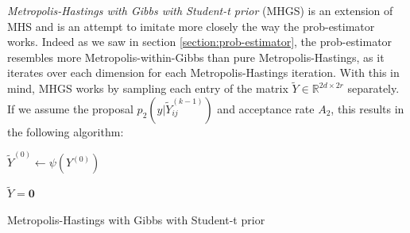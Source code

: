 \documentclass[12pt]{memoir}
\newcommand{\mb}{\mathbf}
\begin{document}
\textit{Metropolis-Hastings with Gibbs with Student-t prior} (MHGS) is an extension of MHS and is an attempt to imitate more closely the way the prob-estimator works. Indeed as we saw in section \ref{section:prob-estimator}, the prob-estimator resembles more Metropolis-within-Gibbs than pure Metropolis-Hastings, as it iterates over each dimension for each Metropolis-Hastings iteration. With this in mind, MHGS works by sampling each entry of the matrix $\tilde Y \in \mathbb{R}^{2d\times 2r}$ separately. If we assume the proposal $p_2(y|\tilde Y^{(k-1)}_{ij})$ and acceptance rate $A_2$, this results in the following algorithm:\medbreak


\begin{algorithm}[H]

    \DontPrintSemicolon







    $\tilde Y^{(0)} \gets \psi(Y^{(0)})$\;

    $\tilde Y = \mb 0$\;


    \caption{Metropolis-Hastings with Gibbs with Student-t prior}

\end{algorithm}\medbreak
\end{document}

